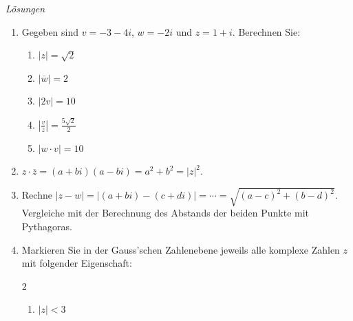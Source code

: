 \clearpage
\emph{Lösungen}
\begin{enumerate}

\item Gegeben sind $v=-3-4i$, $w=-2i$ und $z=1+i$. Berechnen Sie:
    \begin{enumerate}
        \item $|z|= \sqrt{2}$
        \item $|\overline{w}|= 2$
        \item $|2v|= 10$
        \item $\left|\frac{v}{z}\right|= \frac{5\sqrt{2}}{2}$
        \item $\left|w\cdot v\right|= 10$
    \end{enumerate}
    
    \item  $z\cdot \overline{z}= (a+bi)(a-bi) = a^2+b^2 = |z|^2$.
    
    \item Rechne $|z-w|= |(a+bi)-(c+di)| = \cdots = \sqrt{(a-c)^2+(b-d)^2}$. Vergleiche mit der Berechnung des Abstands der beiden Punkte mit Pythagoras.
    \item Markieren Sie in der Gauss'schen Zahlenebene jeweils alle komplexe Zahlen $z$ mit folgender Eigenschaft:

        \begin{multicols}{2}
        \begin{enumerate}
            \item $|z|<3$
            \begin{center}
        
            \end{center}
            

\end{enumerate}
\end{multicols}
\end{enumerate}
